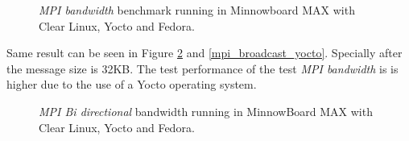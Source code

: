 \begin{figure}[H]
\begin{center}
\end{center}
\caption{\textit{MPI bandwidth} benchmark running in Minnowboard MAX with Clear Linux,
Yocto and Fedora.}
\label{mpi_bandwidth_yocto}
\end{figure}


Same result can be seen in Figure \ref{mpi_bibw_yocto} and
\ref{mpi_broadcast_yocto}. Specially after the
message size is 32KB. The test performance of the test \textit{MPI bandwidth}
is is higher due to the use of a Yocto operating system. 

\begin{figure}[H]
\begin{center}
\end{center}
\caption{\textit{MPI Bi directional} bandwidth running in MinnowBoard MAX with Clear Linux,
Yocto and Fedora.}
\label{mpi_bibw_yocto}
\end{figure}

